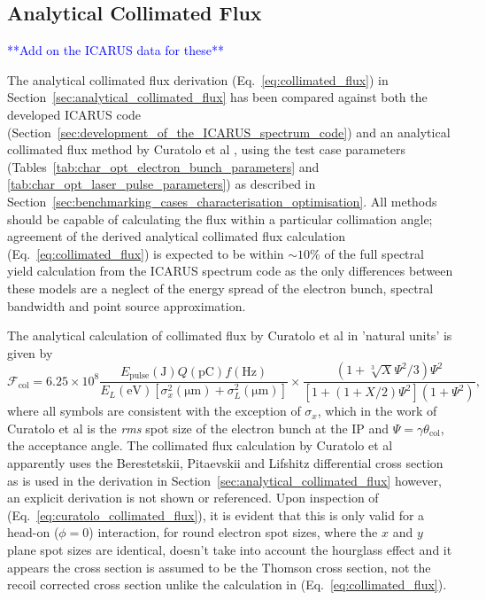 \documentclass[../main.tex]{subfiles}
\begin{document}
\subsection{Analytical Collimated Flux}

\textcolor{blue}{ **Add on the ICARUS data for these** }

The analytical collimated flux derivation (Eq.~\ref{eq:collimated_flux}) in Section~\ref{sec:analytical_collimated_flux} has been compared against both the developed \textsc{ICARUS} code (Section~\ref{sec:development_of_the_ICARUS_spectrum_code}) and an analytical collimated flux method by Curatolo et al \cite{curatolo2017analytical}, using the test case parameters (Tables~\ref{tab:char_opt_electron_bunch_parameters} and \ref{tab:char_opt_laser_pulse_parameters}) as described in Section~\ref{sec:benchmarking_cases_characterisation_optimisation}. All methods should be capable of calculating the flux within a particular collimation angle; agreement of the derived analytical collimated flux calculation (Eq.~\ref{eq:collimated_flux}) is expected to be within $\sim10$\% of the full spectral yield calculation from the \textsc{ICARUS} spectrum code as the only differences between these models are a neglect of the energy spread of the electron bunch, spectral bandwidth and point source approximation. 

The analytical calculation of collimated flux by Curatolo et al \cite{curatolo2017analytical} in 'natural units' is given by  
\begin{equation}
\mathcal{F}_{\mathrm{col}} = 6.25\times 10^{8}\frac{E_{\mathrm{pulse}}\left(\mathrm{\si{\joule}}\right)Q\left(\si{\pico\coulomb}\right)f\left(\si{\hertz}\right)}{E_{L}\left(\si{\electronvolt}\right)\left[\sigma_{x}^{2}\left(\si{\micro\meter}\right)+\sigma_{L}^{2}\left(\si{\micro\meter}\right)\right]}\times\frac{\left(1+\sqrt[3]{X}\Psi^{2}/3\right)\Psi^{2}}{\left[1+\left(1+X/2\right)\Psi^{2}\right]\left(1+\Psi^{2}\right)},
\label{eq:curatolo_collimated_flux}
\end{equation}
where all symbols are consistent with the exception of $\sigma_{x}$, which in the work of Curatolo et al is the \textit{rms} spot size of the electron bunch at the IP and $\Psi = \gamma\theta_{\mathrm{col}}$, the acceptance angle. The collimated flux calculation by Curatolo et al \cite{curatolo2017analytical} apparently uses the Berestetskii, Pitaevskii and Lifshitz \cite{berestetskii1982quantum} differential cross section as is used in the derivation in Section~\ref{sec:analytical_collimated_flux} however, an explicit derivation is not shown or referenced. Upon inspection of (Eq.~\ref{eq:curatolo_collimated_flux}), it is evident that this is only valid for a head-on ($\phi=0$) interaction, for round electron spot sizes, where the $x$ and $y$ plane spot sizes are identical, doesn't take into account the hourglass effect \cite{furman1991hourglass,miyahara2008luminosity} and it appears the cross section is assumed to be the Thomson cross section, not the recoil corrected cross section unlike the calculation in (Eq.~\ref{eq:collimated_flux}).   
\end{document}
